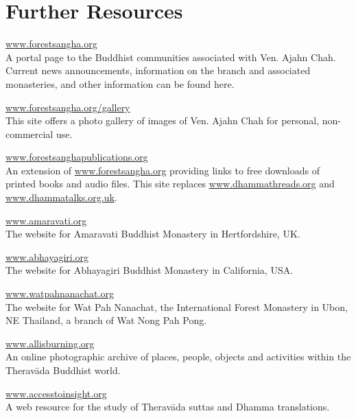 
\chapter{Further Resources}

\vspace*{-\baselineskip}
{\setlength{\parindent}{0pt}\setlength{\parskip}{1.2em}

\href{http://forestsangha.org/}{\large www.forestsangha.org}\\
A portal page to the Buddhist communities associated with Ven. Ajahn Chah. Current news announcements, information on the branch and associated monasteries, and other information can be found here.

\href{http://forestsangha.org/gallery/}{\large www.forestsangha.org/gallery}\\
This site offers a photo gallery of images of Ven. Ajahn Chah for personal, non-commercial use.

\href{http://forestsanghapublications.org/}{\large www.forestsanghapublications.org}\\
An extension of \href{http://forestsangha.org/}{www.forestsangha.org} providing links to free downloads of printed books and audio files. This site replaces \href{http://www.dhammathreads.org/}{www.dhammathreads.org} and \href{http://www.dhammatalks.org.uk/}{www.dhammatalks.org.uk}.

\href{http://amaravati.org/}{\large www.amaravati.org}\\
The website for Amaravati Buddhist Monastery in Hertfordshire, UK.

\href{http://www.abhayagiri.org/}{\large www.abhayagiri.org}\\
The website for Abhayagiri Buddhist Monastery in California, USA.

\href{http://watpahnanachat.org/}{\large www.watpahnanachat.org}\\
The website for Wat Pah Nanachat, the International Forest Monastery in Ubon, NE Thailand, a branch of Wat Nong Pah Pong.

\href{http://allisburning.org/}{\large www.allisburning.org}\\
An online photographic archive of places, people, objects and activities within the Therav\=ada Buddhist world.

\href{http://www.accesstoinsight.org/}{\large www.accesstoinsight.org}\\
A web resource for the study of Therav\=ada suttas and Dhamma translations.

}
